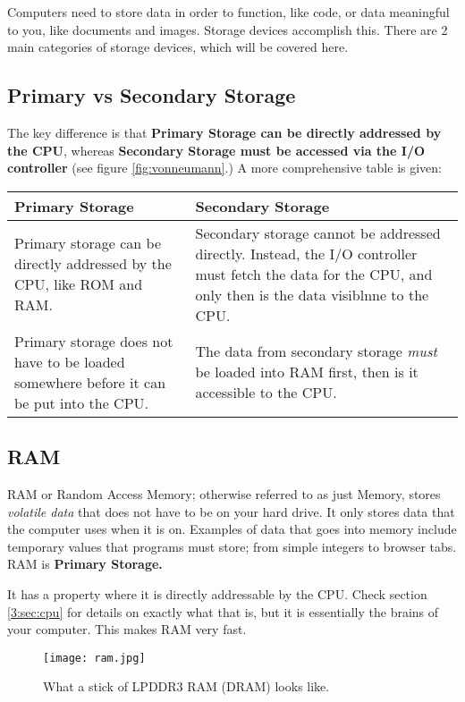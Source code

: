 \documentclass[../main.tex]{subfiles}
\begin{document}
Computers need to store data in order to function, like code, or data meaningful to you, like documents and images. Storage devices accomplish this. There are 2 main categories of storage devices, which will be covered here.

\subsection{Primary vs Secondary Storage}

The key difference is that \textbf{Primary Storage can be directly addressed by the CPU}, whereas \textbf{Secondary Storage must be accessed via the I/O controller} (see figure \ref{fig:vonneumann}.) A more comprehensive table is given:

\begin{longtable}{|p{}|p{}|}
    \hline
    \textbf{Primary Storage} & \textbf{Secondary Storage} 
    \\ \hline
    Primary storage can be directly addressed by the CPU, like ROM and RAM. & Secondary storage cannot be addressed directly. Instead, the I/O controller must fetch the data for the CPU, and only then is the data visiblnne to the CPU.
    \\ \hline
    Primary storage does not have to be loaded somewhere before it can be put into the CPU. & The data from secondary storage \emph{must} be loaded into RAM first, then is it accessible to the CPU.
    \\ \hline
\end{longtable}

\subsection{RAM}
\label{3:sec:ram}

RAM or Random Access Memory; otherwise referred to as just Memory, stores \emph{volatile data} that does not have to be on your hard drive. It only stores data that the computer uses when it is on. Examples of data that goes into memory include temporary values that programs must store; from simple integers to browser tabs. RAM is \textbf{Primary Storage.}

It has a property where it is directly addressable by the CPU. Check section \ref{3:sec:cpu} for details on exactly what that is, but it is essentially the brains of your computer. This makes RAM very fast.

\begin{figure}[H]
    \centering
    \texttt{[image: ram.jpg]}
    \caption{What a stick of LPDDR3 RAM (DRAM) looks like.}
    \label{fig:ram}
\end{figure}
\end{document}
